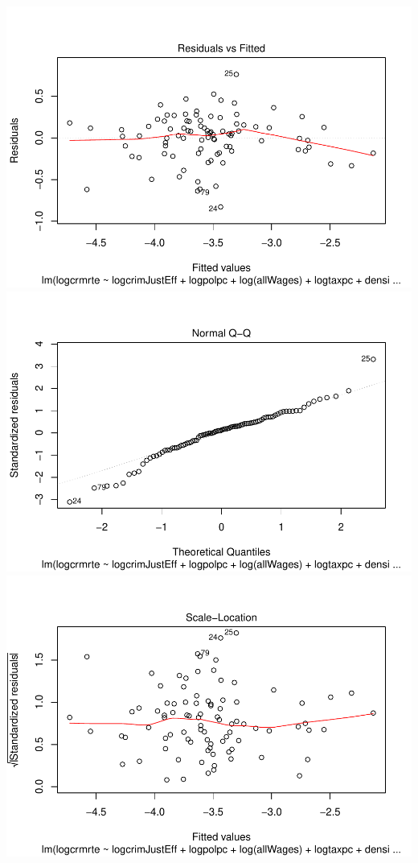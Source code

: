 \documentclass[]{article}
\begin{document}
\includegraphics{Bagnard_Gaustad_Hartman_Leung_Lab_3_files/figure-latex/unnamed-chunk-105-1.pdf}
\includegraphics{Bagnard_Gaustad_Hartman_Leung_Lab_3_files/figure-latex/unnamed-chunk-105-2.pdf}
\includegraphics{Bagnard_Gaustad_Hartman_Leung_Lab_3_files/figure-latex/unnamed-chunk-105-3.pdf}
\end{document}

